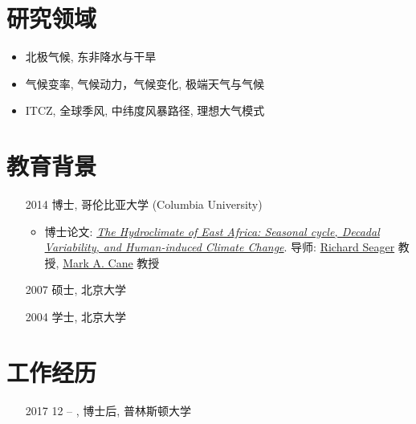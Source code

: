 \documentclass[11pt]{article}
\newcommand{\richard}{\href{http://www.ldeo.columbia.edu/res/div/ocp/people/seager/}{Richard Seager}}
\newcommand{\cane}{\href{http://www.ldeo.columbia.edu/user/mcane}{Mark A. Cane}}
\newcommand{\phdThesis}{\href{https://academiccommons.columbia.edu/catalog/ac:181305}{\textit{The Hydroclimate of East Africa: Seasonal cycle, Decadal Variability, and Human-induced Climate Change}}}
\begin{document}
\begin{CJK*}{UTF8}{gkai}
\section{研究领域}
\begin{itemize}[leftmargin=4ex,label={}, noitemsep, nolistsep]
	\item 北极气候, 东非降水与干旱
	 \item 气候变率, 气候动力，气候变化, 极端天气与气候
	 \item ITCZ, 全球季风, 中纬度风暴路径, 理想大气模式
\end{itemize}


\section{教育背景}
\begin{itemize}[leftmargin=10ex,label={}, noitemsep, nolistsep]
	\item[2014] 博士, 哥伦比亚大学 (Columbia University)
	\begin{itemize}[leftmargin=0ex,label={},noitemsep,nolistsep]
		\item 博士论文: \phdThesis{}. 导师: \richard{} 教授,  \cane{} 教授
		\end{itemize}
	\item[2007] 硕士, 北京大学
	\item[2004] 学士, 北京大学
	\end{itemize}


\section{工作经历}
\begin{itemize}[leftmargin=10ex,label={},noitemsep,nolistsep]
	\item[2017] 12 -- , 博士后, 普林斯顿大学
	

\end{itemize}
\end{CJK*}
\end{document}

